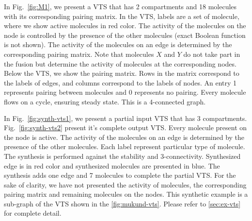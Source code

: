 \begin{example}
%
In Fig.~\ref{fig:M1}, we present a VTS that has 2 compartments and 18 molecules with its corresponding pairing matrix.
%
%
In the VTS, labels are a set of molecule, where we show active molecules in red color.
%
The activity of the molecules on the node is controlled
by the presence of the other molecules (exact Boolean function is not shown). 
%
The activity of the molecules on an edge is determined by the corresponding pairing matrix.
%
Note that molecules $X$ and $Y$ do not take part in the fusion but determine the activity of molecules at the corresponding nodes.
%
Below the VTS, we show the pairing matrix.
%
Rows in the matrix correspond to the labels of edges, and columns correspond to the labels of nodes.
%
An entry 1 represents pairing between molecules and 0 represents no pairing.
%
Every molecule flows on a cycle, ensuring steady state.
%
This is a 4-connected graph.
\end{example}

\begin{example}
	In Fig.~\ref{fig:synth-vts1}, we present a partial input VTS that has 3 compartments. Fig.~\ref{fig:synth-vts2} present it's complete output VTS. Every molecule present on the node is active. The activity of the molecules on an edge is determined by the presence of the other molecules. Each label represent particular type of molecule. The synthesis is performed against the stability and 3-connectivity. Synthesized edge is in red color and synthesized molecules are presented in blue. The synthesis adds one edge and 7 molecules to complete the partial VTS. For the sake of clarity, we have not presented the activity of molecules, the corresponding pairing matrix and remaining molecules on the nodes. This synthetic example is a sub-graph of the VTS shown in the \ref{fig:mukund-vts}. Please refer to \ref{sec:ex-vts} for complete detail. 
\end{example}

%
\label{subsec:graphmodel}
%
%
%

